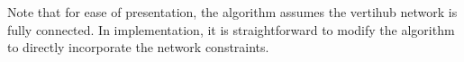 Note that for ease of presentation, the algorithm assumes the vertihub network is fully connected. In implementation, it is straightforward to modify the algorithm to directly incorporate the network constraints. 





